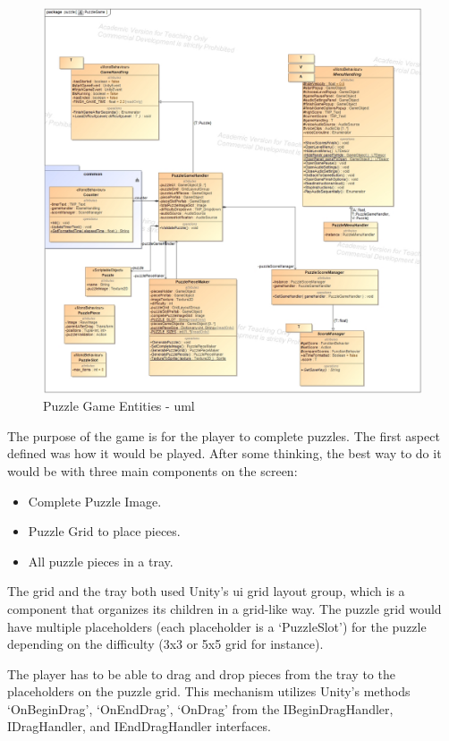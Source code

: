 \begin{figure}[!h]
    \centering
    \includegraphics[width=\linewidth]{Chapters/new_architechture/class__puzzle__PuzzleGame.jpg}
    \caption{Puzzle Game Entities - \gls{uml}}
    \label{fig:puzzleGameArq}
\end{figure}

The purpose of the game is for the player to complete puzzles. The first aspect defined was how it would be played. After some thinking, the best way to do it would be with three main components on the screen:

\begin{itemize}
    \item Complete Puzzle Image.
    \item Puzzle Grid to place pieces.
    \item All puzzle pieces in a tray.
\end{itemize}

The grid and the tray both used Unity's \gls{ui} grid layout group, which is a component that organizes its children in a grid-like way. The puzzle grid would have multiple placeholders (each placeholder is a `PuzzleSlot') for the puzzle depending on the difficulty (3x3 or 5x5 grid for instance).

The player has to be able to drag and drop pieces from the tray to the placeholders on the puzzle grid. This mechanism utilizes Unity's methods `OnBeginDrag', `OnEndDrag', `OnDrag' from the IBeginDragHandler, IDragHandler, and IEndDragHandler interfaces.

